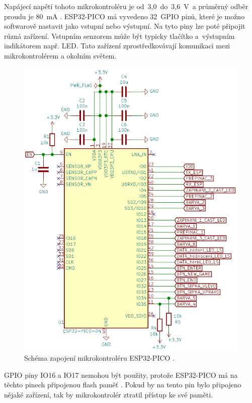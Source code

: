   Napájecí napětí tohoto mikrokontroléru je od~3,0~do~3,6~V~a průměrný odběr proudu je 80~mA \cite{PICO_datasheet}. ESP32-PICO má vyvedeno 
  32~GPIO pinů, které je 
  možno softwarově nastavit jako vstupní nebo výstupní. Na tyto piny lze poté připojit různá zařízení. Vstupním senzorem může 
  být typicky tlačítko a~výstupním indikátorem např. LED. Tato zařízení zprostředkovávají komunikaci mezi mikrokontrolérem a okolním 
  světem.

  \begin{figure}[!h]
    \begin{center}
      \includegraphics[scale=0.5]{obrazky/ESP32_PICO_schema.png}
    \end{center}
    \caption[Schéma zapojení mikrokontroléru ESP32-PICO \cite{PICO_datasheet}]{Schéma zapojení mikrokontroléru ESP32-PICO \cite{PICO_datasheet}.}
  \end{figure}

  GPIO piny IO16 a IO17 nemohou být použity, protože ESP32-PICO má na těchto pinech připojenou flash paměť \cite{PICO_datasheet}.
  Pokud by na tento pin bylo připojeno nějaké zařízení, tak by mikrokontrolér ztratil přístup ke své paměti.


